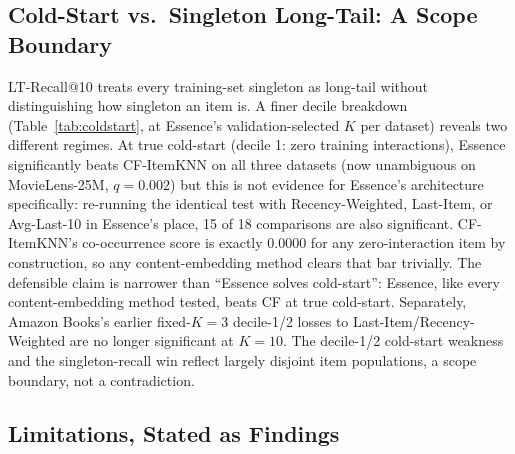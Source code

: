 \documentclass{article}
\begin{document}
\subsection{Cold-Start vs.\ Singleton Long-Tail: A Scope Boundary}
\label{sec:coldstart}

LT-Recall@10 treats every training-set singleton as long-tail without distinguishing how singleton an item is. A finer decile breakdown (Table~\ref{tab:coldstart}, at Essence's validation-selected $K$ per dataset) reveals two different regimes. At true cold-start (decile 1: zero training interactions), Essence significantly beats CF-ItemKNN on all three datasets (now unambiguous on MovieLens-25M, $q=0.002$) but this is not evidence for Essence's architecture specifically: re-running the identical test with Recency-Weighted, Last-Item, or Avg-Last-10 in Essence's place, 15 of 18 comparisons are also significant. CF-ItemKNN's co-occurrence score is exactly $0.0000$ for any zero-interaction item by construction, so any content-embedding method clears that bar trivially. The defensible claim is narrower than ``Essence solves cold-start'': Essence, like every content-embedding method tested, beats CF at true cold-start. Separately, Amazon Books's earlier fixed-$K=3$ decile-1/2 losses to Last-Item/Recency-Weighted are no longer significant at $K=10$. The decile-1/2 cold-start weakness and the singleton-recall win reflect largely disjoint item populations, a scope boundary, not a contradiction.

\subsection{Limitations, Stated as Findings}
\label{sec:limitations-findings}
\end{document}
